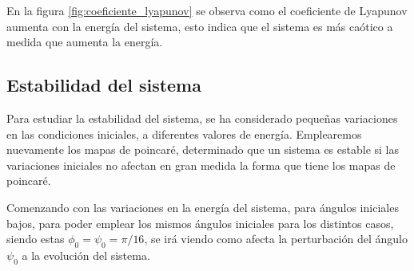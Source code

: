\documentclass[11pt, twoside]{article} %
\begin{document}
En la figura \ref{fig:coeficiente_lyapunov} se observa como el coeficiente
de Lyapunov aumenta con la energía del sistema, esto indica que el sistema
es más caótico a medida que aumenta la energía.

\subsection{Estabilidad del sistema}

Para estudiar la estabilidad del sistema, se ha considerado pequeñas
variaciones en las condiciones iniciales, a diferentes valores de 
energía. Emplearemos nuevamente los mapas de poincaré, determinado que 
un sistema es estable si las variaciones iniciales no afectan en gran medida
la forma que tiene los mapas de poincaré.

Comenzando con las variaciones en la energía del sistema, para ángulos 
iniciales bajos, para poder emplear los mismos ángulos iniciales para los 
distintos casos, siendo estas $\phi_0 = \psi_0 = \pi/16$, se irá viendo como 
afecta la perturbación del ángulo $\psi_0$ a la evolución del sistema.
\end{document}
